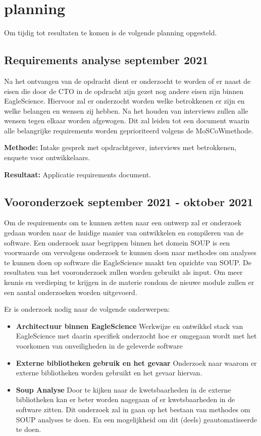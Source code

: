 {\section{planning}\label{sec:planning}
Om tijdig tot resultaten te komen is de volgende planning opgesteld.

\subsection{Requirements analyse \textbf{september 2021}}\label{subsec:requirements-analyse}
Na het ontvangen van de opdracht dient er onderzocht te worden of er naast de eisen die door de CTO in de opdracht zijn gezet nog andere eisen zijn binnen EagleScience. Hiervoor zal er onderzocht worden welke betrokkenen er zijn en welke belangen en wensen zij hebben. Na het houden van interviews zullen alle wensen tegen elkaar worden afgewogen. Dit zal leiden tot een document waarin alle belangrijke requirements worden geprioriteerd volgens de MoSCoW\-methode.

\textbf{Methode:} Intake gesprek met opdrachtgever, interviews met betrokkenen, enquete voor ontwikkelaars.

\textbf{Resultaat:} Applicatie requirements document.

\subsection{Vooronderzoek \textbf{september 2021 - oktober 2021 }}\label{subsec:onderzoek}
Om de requirements om te kunnen zetten naar een ontwerp zal er onderzoek gedaan worden naar de huidige manier van ontwikkelen en compileren van de software. Een onderzoek naar begrippen binnen het domein SOUP is een voorwaarde om vervolgens onderzoek te kunnen doen naar methodes om analyses te kunnen doen op software die EagleScience maakt ten opzichte van SOUP. De resultaten van het vooronderzoek zullen worden gebruikt als input.
Om meer kennis en verdieping te krijgen in de materie rondom de nieuwe module zullen er een aantal onderzoeken worden uitgevoerd.


Er is onderzoek nodig naar de volgende onderwerpen:
\begin{itemize}
    \item \textbf{Architectuur binnen EagleScience} Werkwijze en ontwikkel stack van EagleScience met daarin specifiek onderzocht hoe er omgegaan wordt met het voorkomen van onveiligheden in de geleverde software
    \item \textbf{Externe bibliotheken gebruik en het gevaar} Onderzoek naar waarom er externe bibliotheken worden gebruikt en het gevaar hiervan.
    \item \textbf{Soup Analyse} Door te kijken naar de kwetsbaarheden in de externe bibliotheken kan er beter worden nagegaan of er kwetsbaarheden in de software zitten. Dit onderzoek zal in gaan op het bestaan van methodes om SOUP analyses te doen. En een mogelijkheid om dit (deels) geautomatiseerde te doen.
\end{itemize}

}
